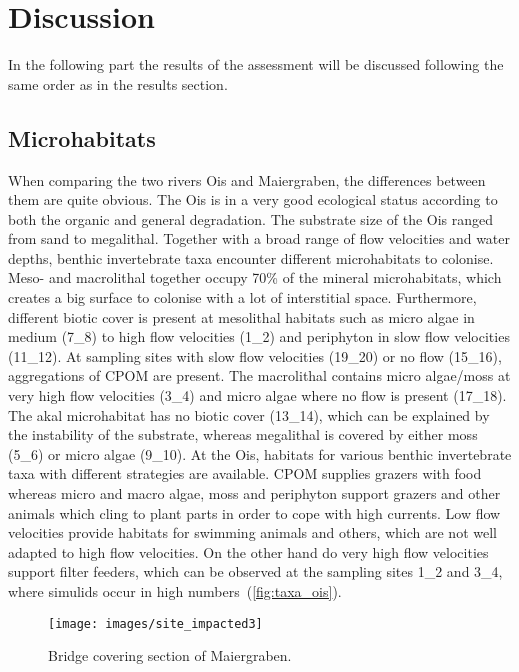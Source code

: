 

\section{Discussion}\label{sec:discussion}                 %

In the following part the results of the assessment will be discussed following the same order as in the results section.

\subsection{Microhabitats}\label{sec:microhabitats_discussion}       %


When comparing the two rivers Ois and Maiergraben, the differences between them are quite obvious. The Ois is in a very good ecological status according to both the organic and general degradation. The substrate size of the Ois ranged from sand to megalithal. Together with a broad range of flow velocities and water depths, benthic invertebrate taxa encounter different microhabitats to colonise. Meso- and macrolithal together occupy 70\% of the mineral microhabitats, which creates a big surface to colonise with a lot of interstitial space. Furthermore, different biotic cover is present at mesolithal habitats such as micro algae in medium (7\_8) to high flow velocities (1\_2) and periphyton in slow flow velocities (11\_12). At sampling sites with slow flow velocities (19\_20) or no flow (15\_16), aggregations of CPOM are present. The macrolithal contains micro algae/moss at very high flow velocities (3\_4) and micro algae where no flow is present (17\_18). The akal microhabitat has no biotic cover (13\_14), which can be explained by the instability of the substrate, whereas megalithal is covered by either moss (5\_6) or micro algae (9\_10). At the Ois, habitats for various benthic invertebrate taxa with different strategies are available. CPOM supplies grazers with food whereas micro and macro algae, moss and periphyton support grazers and other animals which cling to plant parts in order to cope with high currents. Low flow velocities provide habitats for swimming animals and others, which are not well adapted to high flow velocities. On the other hand do very high flow velocities support filter feeders, which can be observed at the sampling sites 1\_2 and 3\_4, where simulids occur in high numbers~(\cref{fig:taxa_ois}).

\begin{wrapfigure}{r}{0.55\textwidth}
\centering
\texttt{[image: images/site\_impacted3]}
\caption{\label{fig:site_impacted3}Bridge covering section of Maiergraben.}
\end{wrapfigure}

